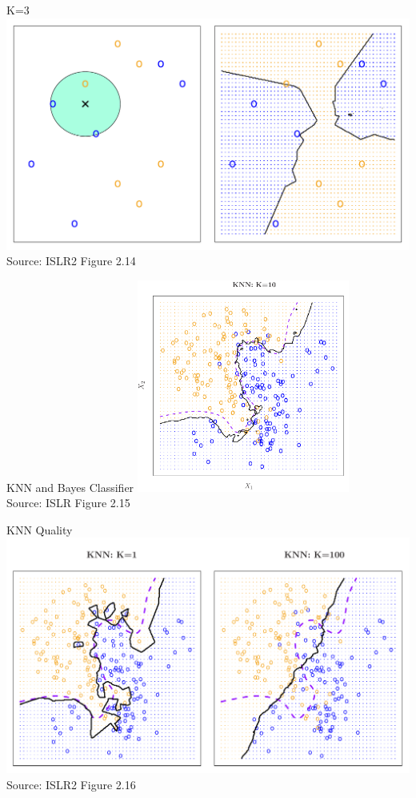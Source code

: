 \documentclass[ignorenonframetext,xcolor=x11names]{beamer}
\begin{document}
\begin{frame}{K=3}
\centering
\includegraphics[width=\textwidth]{Figures_Chapters_1-6/Chapter2/2_14.pdf} \\
\vspace{3mm}
\scriptsize Source: ISLR2 Figure 2.14
\end{frame}

\begin{frame}{KNN and Bayes Classifier}
\centering
\includegraphics[height=2.75in]{Figures_Chapters_1-6/Chapter2/2_15.pdf} \\
\vspace{3mm}
\scriptsize Source: ISLR Figure 2.15
\end{frame}

\begin{frame}{KNN Quality}
\centering
\includegraphics[width=\textwidth]{Figures_Chapters_1-6/Chapter2/2_16.pdf} \\
\vspace{3mm}
\scriptsize Source: ISLR2 Figure 2.16
\end{frame}
\end{document}
